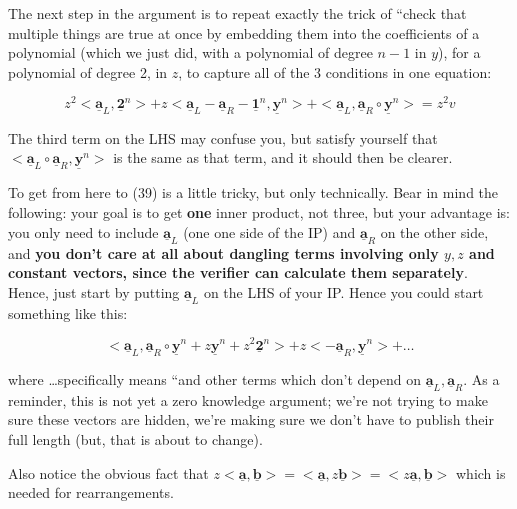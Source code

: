 \documentclass[10pt,a4paper]{article}
\begin{document}
\vspace{5 pt}

The next step in the argument is to repeat exactly the trick of ``check that multiple things are true at once by embedding them  into the coefficients of a polynomial (which we just did, with a polynomial of degree $n-1$ in $y$), for a polynomial of degree 2, in $z$, to capture all of the 3 conditions in one equation:

$$z^2 <\underline{\textbf{a}}_L, \underline{\textbf{2}}^n> + z<\underline{\textbf{a}}_L - \underline{\textbf{a}}_R - \underline{\textbf{1}}^n, \underline{\textbf{y}}^n> + <\underline{\textbf{a}}_L, \underline{\textbf{a}}_R \circ \underline{\textbf{y}}^n> = z^2v$$

The third term on the LHS may confuse you, but satisfy yourself that $<\underline{\textbf{a}}_L \circ \underline{\textbf{a}}_R, \underline{\textbf{y}}^n>$ is the same as that term, and it should then be clearer.

\vspace{5 pt}

To get from here to (39) is a little tricky, but only technically. Bear in mind the following: your goal is to get \textbf{one} inner product, not three, but your advantage is: you only need to include $\underline{\textbf{a}}_L$ (one one side of the IP) and $\underline{\textbf{a}}_R$ on the other side, and \textbf{you don't care at all about dangling terms involving only $y, z$ and constant vectors, since the verifier can calculate them separately}. Hence, just  start by putting $\underline{\textbf{a}}_L$ on the LHS of your IP. Hence you could start something like this:

$$<\underline{\textbf{a}}_L, \underline{\textbf{a}}_R \circ \underline{\textbf{y}}^n + z\underline{\textbf{y}}^n + z^2 \underline{\textbf{2}}^n> + z<-\underline{\textbf{a}}_R, \underline{\textbf{y}}^n> + \ldots$$

where \ldots specifically means ``and other terms which don't depend on $\underline{\textbf{a}}_L,\underline{\textbf{a}}_R$. As a reminder, this is not yet a zero knowledge argument; we're not trying to make sure these vectors are hidden, we're making sure we don't have to publish their full length (but, that is about to change).

Also notice the obvious fact that $z<\underline{\textbf{a}}, \underline{\textbf{b}}> = <\underline{\textbf{a}}, z\underline{\textbf{b}}> = <z\underline{\textbf{a}}, \underline{\textbf{b}}>$ which is needed for rearrangements.
\end{document}
